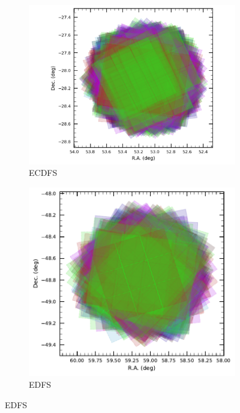 \begin{figure}[ht]
\begin{subfigure}[b]{0.22\textwidth}
    \end{subfigure}\hfill
    \begin{subfigure}[b]{0.22\textwidth}
        \centering
        \includegraphics[width= \linewidth]{showVisit_DP1_ECDFS}
        \caption{ECDFS}
    \end{subfigure}
    \begin{subfigure}[b]{0.22\textwidth}
        \centering
        \includegraphics[width=\linewidth]{showVisit_DP1_EDFS}
        \caption{EDFS}
    \end{subfigure}\hfill
    \vspace{1em}


\end{figure}
